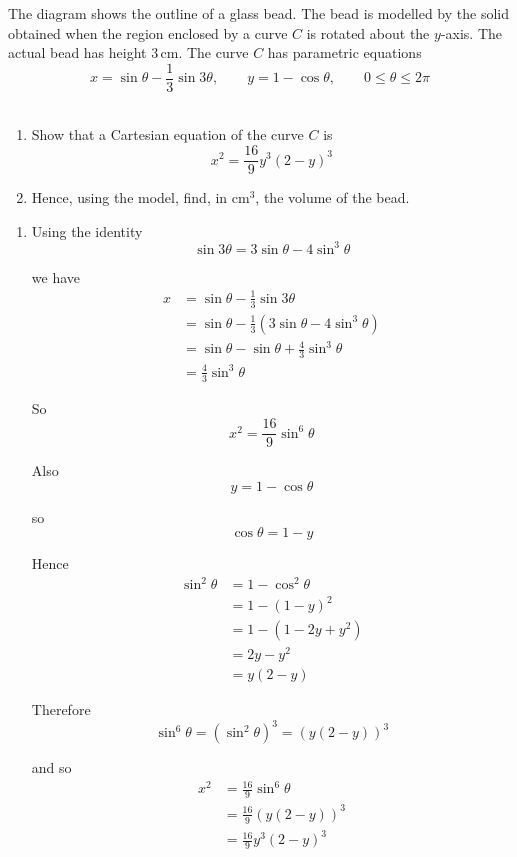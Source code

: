 \documentclass[leqno]{article}
\begin{document}
\begin{enumerate}[
  label=\textbf{\arabic*.},
  leftmargin=*,
  topsep=0pt,
  partopsep=0pt,
  parsep=0pt
]
The diagram shows the outline of a glass bead. The bead is modelled by the solid obtained when the region enclosed by a curve $C$ is rotated about the $y$-axis. The actual bead has height $3\,\mathrm{cm}$. The curve $C$ has parametric equations
\[
x = \sin\theta - \frac{1}{3}\sin 3\theta,\qquad y = 1 - \cos\theta,\qquad 0 \le \theta \le 2\pi
\] \\

\begin{enumerate}[label=\textbf{(\alph*)}]
  \item Show that a Cartesian equation of the curve $C$ is
  \[
  x^2 = \frac{16}{9}y^3(2-y)^3
  \]
  \item Hence, using the model, find, in $\mathrm{cm}^3$, the volume of the bead.  \\
\end{enumerate}

\vspace*{10pt}

\begin{djsSolution}
\begin{enumerate}[label=\textbf{(\alph*)}]
  \item Using the identity
\[
\sin 3\theta = 3\sin\theta - 4\sin^3\theta
\]

we have
\begin{align*}
x&=\sin\theta-\frac13\sin 3\theta\\
&=\sin\theta-\frac13\left(3\sin\theta-4\sin^3\theta\right)\\
&=\sin\theta-\sin\theta+\frac43\sin^3\theta\\
&=\frac43\sin^3\theta
\end{align*}

So
\[
x^2=\frac{16}{9}\sin^6\theta
\]

Also
\[
y=1-\cos\theta
\]

so
\[
\cos\theta=1-y
\]

Hence
\begin{align*}
\sin^2\theta&=1-\cos^2\theta\\
&=1-(1-y)^2\\
&=1-(1-2y+y^2)\\
&=2y-y^2\\
&=y(2-y)
\end{align*}

Therefore
\[
\sin^6\theta=\left(\sin^2\theta\right)^3=\left(y(2-y)\right)^3
\]

and so
\begin{align*}
x^2&=\frac{16}{9}\sin^6\theta\\
&=\frac{16}{9}\left(y(2-y)\right)^3\\
&=\frac{16}{9}y^3(2-y)^3
\end{align*}


\end{enumerate}
\end{djsSolution}
\end{enumerate}
\end{document}
